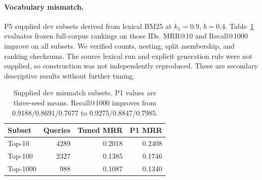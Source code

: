 \paragraph{Vocabulary mismatch.}
P5 supplied dev subsets derived from lexical BM25 at $k_1=0.9$, $b=0.4$.
Table~\ref{tab:p1-mismatch} evaluates frozen full-corpus rankings on those IDs.
MRR@10 and Recall@1000 improve on all subsets. We verified counts, nesting,
split membership, and ranking checksums. The source lexical run and explicit
generation rule were not supplied, so construction was not independently
reproduced. These are secondary descriptive results without further tuning.
\begin{table}[t]
\centering
\small
\begin{tabular}{lrrr}
\hline
Subset & Queries & Tuned MRR & P1 MRR \\
\hline
Top-10 & 4289 & 0.2018 & 0.2408 \\
Top-100 & 2327 & 0.1385 & 0.1746 \\
Top-1000 & 988 & 0.1087 & 0.1340 \\
\hline
\end{tabular}
\caption{Supplied dev mismatch subsets. P1 values are three-seed means. Recall@1000 improves from 0.9188/0.8691/0.7677 to 0.9275/0.8847/0.7985.}
\label{tab:p1-mismatch}
\end{table}
